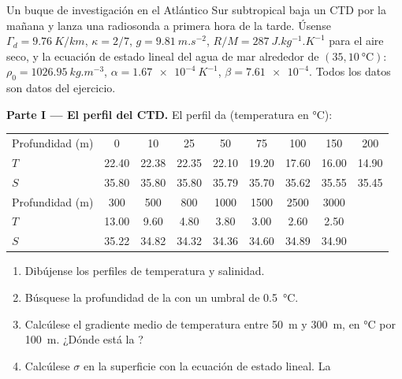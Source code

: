 \begin{problem}
\label{pb:b1:fluid-envelopes-structure:1}
Un buque de investigación en el Atlántico Sur subtropical baja un CTD por la mañana y lanza una radiosonda a primera hora de la tarde. Úsense $\Gamma_d =
\qty{9.76}{K/km}$, $\kappa = 2/7$, $g = \qty{9.81}{m.s^{-2}}$, $R/M =
\qty{287}{J.kg^{-1}.K^{-1}}$ para el aire seco, y la ecuación de estado lineal del agua de mar alrededor de $(35, \qty{10}{\celsius})$: $\rho_0 = \qty{1026.95}{kg.m^{-3}}$,
$\alpha = \qty{1.67e-4}{K^{-1}}$, $\beta = \num{7.61e-4}$. Todos los datos son datos del ejercicio.

\medskip
\noindent\textbf{Parte I --- El perfil del CTD.} El perfil da (temperatura en
\si{\celsius}):
\begin{center}
\small
\setlength{\tabcolsep}{3pt}
\begin{tabular}{|l|*{8}{c}|}
\hline
Profundidad (m) & 0 & 10 & 25 & 50 & 75 & 100 & 150 & 200 \\
$T$ & 22.40 & 22.38 & 22.35 & 22.10 & 19.20 & 17.60 & 16.00 & 14.90 \\
$S$ & 35.80 & 35.80 & 35.80 & 35.79 & 35.70 & 35.62 & 35.55 & 35.45 \\
\hline
Profundidad (m) & 300 & 500 & 800 & 1000 & 1500 & 2500 & 3000 & \\
$T$ & 13.00 & 9.60 & 4.80 & 3.80 & 3.00 & 2.60 & 2.50 & \\
$S$ & 35.22 & 34.82 & 34.32 & 34.36 & 34.60 & 34.89 & 34.90 & \\
\hline
\end{tabular}
\end{center}
\begin{enumerate}
  \item Dibújense los perfiles de temperatura y salinidad.
  \item Búsquese la profundidad de la  con un umbral de \qty{0.5}{\celsius}.
  \item Calcúlese el gradiente medio de temperatura entre \qty{50}{m} y
        \qty{300}{m}, en \si{\celsius} por \qty{100}{m}. ¿Dónde está la ?
  \item Calcúlese $\sigma$ en la superficie con la ecuación de estado lineal. La

\end{enumerate}
\end{problem}
